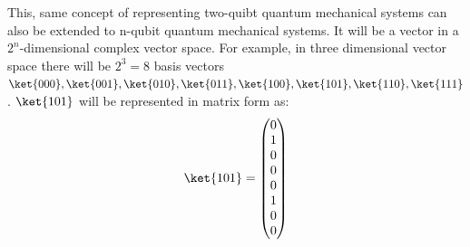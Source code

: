 \documentclass[12pt, oneside]{book}
\theoremstyle{definition}
\theoremstyle{definition}
\theoremstyle{remark}
\begin{document}
This, same concept of representing two-quibt quantum mechanical systems can also be extended to n-qubit quantum mechanical systems. It will be a vector in a $2^n$-dimensional complex vector space.
For example, in three dimensional vector space there will be $2^3=8$ basis vectors $\ket{000},\ket{001},\ket{010},\ket{011},\ket{100},\ket{101},\ket{110},\ket{111}$.
$\ket{101}$ will be represented in matrix form as:
\[
    \ket{101}=\begin{pmatrix} 0 \\ 1 \\ 0 \\ 0 \\ 0 \\ 1 \\ 0 \\ 0 \end{pmatrix}
\]
\end{document}
